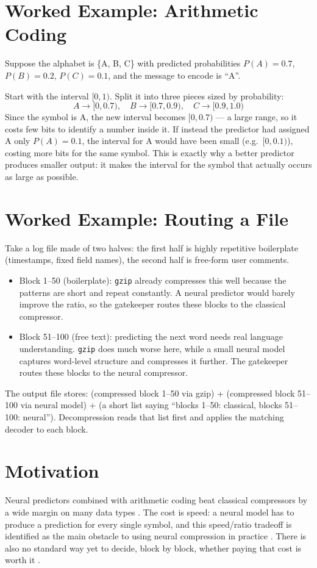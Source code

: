 \documentclass[11pt]{article}
\begin{document}
\section{Worked Example: Arithmetic Coding}
Suppose the alphabet is \{A, B, C\} with predicted probabilities
$P(A)=0.7$, $P(B)=0.2$, $P(C)=0.1$, and the message to encode is ``A''.

Start with the interval $[0, 1)$. Split it into three pieces sized by
probability:
\[
A \to [0, 0.7), \quad B \to [0.7, 0.9), \quad C \to [0.9, 1.0)
\]
Since the symbol is A, the new interval becomes $[0, 0.7)$ --- a large
range, so it costs few bits to identify a number inside it. If instead the
predictor had assigned A only $P(A)=0.1$, the interval for A would have
been small (e.g.\ $[0, 0.1)$), costing more bits for the same symbol. This
is exactly why a better predictor produces smaller output: it makes the
interval for the symbol that actually occurs as large as possible.

\section{Worked Example: Routing a File}
Take a log file made of two halves: the first half is highly repetitive
boilerplate (timestamps, fixed field names), the second half is
free-form user comments.

\begin{itemize}[nosep]
  \item Block 1--50 (boilerplate): \texttt{gzip} already compresses this
  well because the patterns are short and repeat constantly. A neural
  predictor would barely improve the ratio, so the gatekeeper routes these
  blocks to the classical compressor.
  \item Block 51--100 (free text): predicting the next word needs
  real language understanding. \texttt{gzip} does much worse here, while a
  small neural model captures word-level structure and compresses it
  further. The gatekeeper routes these blocks to the neural compressor.
\end{itemize}
The output file stores: (compressed block 1--50 via gzip) + (compressed
block 51--100 via neural model) + (a short list saying ``blocks 1--50:
classical, blocks 51--100: neural''). Decompression reads that list first
and applies the matching decoder to each block.

\section{Motivation}
Neural predictors combined with arithmetic coding beat classical
compressors by a wide margin on many data types \cite{deletang2024,bellard2019,goyal2018dzip}.
The cost is speed: a neural model has to produce a prediction for every
single symbol, and this speed/ratio tradeoff is identified as the main
obstacle to using neural compression in practice \cite{kipf2026}. There is
also no standard way yet to decide, block by block, whether paying that
cost is worth it \cite{aitdcc2026}.
\end{document}
